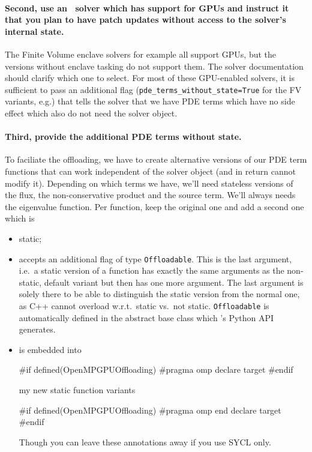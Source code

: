 \paragraph{Second, use an \ExaHyPE\ solver which has support for GPUs and instruct
it that you plan to have patch updates without access to the solver's
internal state.}
The Finite Volume enclave solvers for example all support GPUs, but the
versions without enclave tasking do not support them.
The solver documentation should clarify which one to select.
For most of these GPU-enabled solvers, it is sufficient to pass an additional
flag (\texttt{pde\_terms\_without\_state=True} for the FV variants, e.g.)
that tells the solver that we have PDE terms which have no side effect which
also do not need the solver object.


\paragraph{Third, provide the additional PDE terms without state.}
%
%
To faciliate the offloading, we have to create alternative versions of our PDE
term functions that can work independent of the solver object (and in return
cannot modify it).
Depending on which terms we have, we'll need stateless versions of the flux, the
non-conservative product and the source term. 
We'll always needs the eigenvalue function. 
Per function, keep the original one and add a second one which is 

\begin{itemize}
  \item static;
  \item accepts an additional flag of type \texttt{Offloadable}. This is the last argument, i.e.~a static
  version of a function has exactly the same arguments as the non-static,
  default variant but then has one more argument. The last argument is solely
  there to be able to distinguish the static version from the normal one, as C++
  cannot overload w.r.t.~static vs.~not static. \texttt{Offloadable} is
  automatically defined in the abstract base class which \ExaHyPE's Python API
  generates.
  \item is embedded into 
\begin{code}
#if defined(OpenMPGPUOffloading)
#pragma omp declare target
#endif

my new static function variants

#if defined(OpenMPGPUOffloading)
#pragma omp end declare target
#endif
\end{code}
  Though you can leave these annotations away if you use SYCL only.  
\end{itemize}

